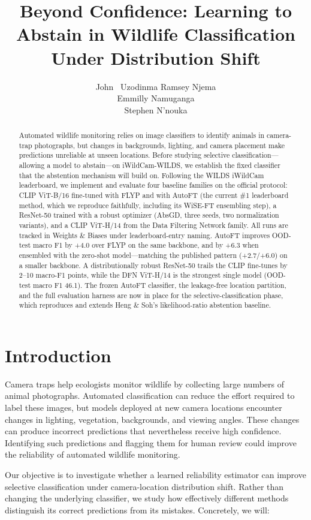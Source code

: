 \documentclass{article}
\title{Beyond Confidence: Learning to Abstain in Wildlife Classification Under Distribution Shift}
\author{%
  John ~Uzodinma
   \And
   Ramsey Njema \\
   \AND
   Emmilly Namuganga \\
   \And
   Stephen N'nouka \\
}
\begin{document}
\maketitle

\begin{abstract}
Automated wildlife monitoring relies on image classifiers to identify animals in
camera-trap photographs, but changes in backgrounds, lighting, and camera placement make
predictions unreliable at unseen locations. Before studying selective
classification---allowing a model to abstain---on iWildCam-WILDS, we establish the fixed
classifier that the abstention mechanism will build on. Following the WILDS iWildCam
leaderboard, we implement and evaluate four baseline families on the official protocol:
CLIP ViT-B/16 fine-tuned with FLYP and with AutoFT (the current \#1 leaderboard method,
which we reproduce faithfully, including its WiSE-FT ensembling step), a ResNet-50 trained
with a robust optimizer (AbsGD, three seeds, two normalization variants), and a CLIP
ViT-H/14 from the Data Filtering Network family. All runs are tracked in Weights \&
Biases under leaderboard-entry naming. AutoFT improves OOD-test macro F1 by +4.0 over
FLYP on the same backbone, and by +6.3 when ensembled with the zero-shot model---matching
the published pattern (+2.7/+6.0) on a smaller backbone. A distributionally robust
ResNet-50 trails the CLIP fine-tunes by 2--10 macro-F1 points, while the DFN ViT-H/14 is
the strongest single model (OOD-test macro F1 46.1). The frozen AutoFT classifier, the
leakage-free location partition, and the full evaluation harness are now in place for the
selective-classification phase, which reproduces and extends Heng \& Soh's
likelihood-ratio abstention baseline.
\end{abstract}

\section{Introduction}
Camera traps help ecologists monitor wildlife by collecting large numbers of animal
photographs. Automated classification can reduce the effort required to label these images,
but models deployed at new camera locations encounter changes in lighting, vegetation,
backgrounds, and viewing angles. These changes can produce incorrect predictions that
nevertheless receive high confidence. Identifying such predictions and flagging them for
human review could improve the reliability of automated wildlife monitoring.

Our objective is to investigate whether a learned reliability estimator can improve
selective classification under camera-location distribution shift. Rather than changing
the underlying classifier, we study how effectively different methods distinguish its
correct predictions from its mistakes. Concretely, we will:
\end{document}
